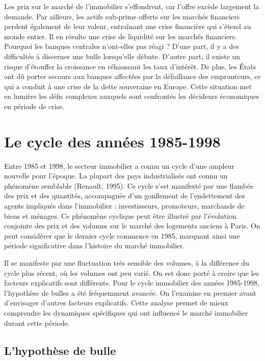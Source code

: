 \documentclass[a4paper, 12pt]{report}
\begin{document}
Les prix sur le marché de l'immobilier s'effondrent, car l'offre excède largement la demande. Par ailleurs, les actifs sub-prime offerts sur les marchés financiers perdent également de leur valeur, entraînant une crise financière qui s'étend au monde entier. Il en résulte une crise de liquidité sur les marchés financiers. Pourquoi les banques centrales n'ont-elles pas réagi ? D'une part, il y a des difficultés à discerner une bulle lorsqu'elle débute. D'autre part, il existe un risque d'étouffer la croissance en réhaussant les taux d'intérêt. De plus, les États ont dû porter secours aux banques affectées par la défaillance des emprunteurs, ce qui a conduit à une crise de la dette souveraine en Europe. Cette situation met en lumière les défis complexes auxquels sont confrontés les décideurs économiques en période de crise.

\section{Le cycle des années 1985-1998}

Entre 1985 et 1998, le secteur immobilier a connu un cycle d'une ampleur nouvelle pour l'époque. La plupart des pays industrialisés ont connu un phénomène semblable (Renault, 1995). Ce cycle s'est manifesté par une flambée des prix et des quantités, accompagnée d'un gonflement de l'endettement des agents impliqués dans l'immobilier : investisseurs, promoteurs, marchands de biens et ménages. Ce phénomène cyclique peut être illustré par l'évolution conjointe des prix et des volumes sur le marché des logements anciens à Paris. On peut considérer que le dernier cycle commence en 1985, marquant ainsi une période significative dans l'histoire du marché immobilier.

Il se manifeste par une fluctuation très sensible des volumes, à la différence du cycle plus récent, où les volumes ont peu varié. On est donc porté à croire que les facteurs explicatifs sont différents. Pour le cycle immobilier des années 1985-1998, l'hypothèse de bulles a été fréquemment avancée. On l'examine en premier avant d'envisager d'autres facteurs explicatifs. Cette analyse permet de mieux comprendre les dynamiques spécifiques qui ont influencé le marché immobilier durant cette période.

\subsection{L’hypothèse de bulle}
\end{document}
